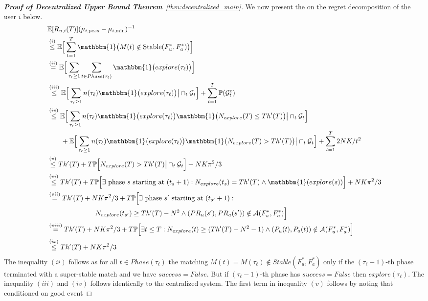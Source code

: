 \documentclass{article}
\begin{document}
\begin{proof}[\textbf{Proof of Decentralized Upper Bound Theorem}~\ref{thm:decentralized_main}]
We now present the on the regret decomposition of the user $i$ below.
\begin{align*}
   &\mathbb{E}[R_{u,i}(T)] (\mu_{i,pess} - \mu_{i, \min})^{-1} \\
   &\overset{(i)}{\leq} \mathbb{E}\Big[\sum_{t=1}^{T}  \mathbbm{1}\big( M(t) \notin \mathrm{Stable}(F^*_u, F^*_a)\big)\Big] \\
   &\overset{(ii)}{=} \mathbb{E}\Big[\sum_{\tau_{\ell}\geq 1} \sum_{t \in Phase(\tau_{\ell})}  \mathbbm{1}\big(explore(\tau_{\ell})\big) \Big] \\
   &\overset{(iii)}{\leq} \mathbb{E}\Big[\sum_{\tau_{\ell}\geq 1} n(\tau_{\ell})  \mathbbm{1}\big(explore(\tau_{\ell})\big) \big\vert \cap_t\mathcal{G}_t \Big] + \sum_{t=1}^{T}\mathbb{P}(\mathcal{G}^c_t)\\
   &\overset{(iv)}{\leq} \mathbb{E}\Big[\sum_{\tau_{\ell}\geq 1} n(\tau_{\ell}) \mathbbm{1}\big(explore(\tau_{\ell})\big) \mathbbm{1} \big(N_{explore}(T) \leq Th'(T)\big)\big\vert \cap_t\mathcal{G}_t  \Big] \\
   & \quad\quad + \mathbb{E}\Big[\sum_{\tau_{\ell}\geq 1}  n(\tau_{\ell}) \mathbbm{1}\big(explore(\tau_{\ell})\big) \mathbbm{1} \big(N_{explore}(T) > Th'(T)\big) \big\vert \cap_t\mathcal{G}_t  \Big] 
   + \sum_{t=1}^{T} 2 NK / t^2\\
   &\overset{(v)}{\leq} Th'(T) + T\mathbb{P}\Big[ N_{explore}(T) > Th'(T) \big\vert \cap_t\mathcal{G}_t \Big]  + N K \pi^2 /3\\
   &\overset{(vi)}{\leq} Th'(T) + T\mathbb{P}\Big[ \exists \text{ phase } s \text{ starting at } (t_s + 1):  N_{explore}(t_s) = Th'(T) \wedge  \mathbbm{1}(explore(s)) \Big] + N K \pi^2 /3 \\
   &\overset{(vii)}{=} Th'(T) + N K \pi^2 /3 + T \mathbb{P}\Big[ \exists \text{ phase } s' \text{ starting at } (t_{s'} + 1): \\ 
   & \hspace{7em} N_{explore}(t_{s'}) \geq  Th'(T) - N^2 \wedge (PR_{u}(s'), PR_{a}(s')) \notin \mathcal{A}(F^*_u, F^*_a) \Big] \\
   &\overset{(viii)}{=} Th'(T) + N K \pi^2 /3 + T \mathbb{P}\Big[ \exists t \leq T: N_{explore}(t) \geq  (Th'(T) - N^2 - 1) \wedge (P_{u}(t), P_{a}(t)) \notin \mathcal{A}(F^*_u, F^*_a) \Big] \\
   &\overset{(ix)}{\leq} Th'(T) + N K \pi^2 /3
\end{align*}
The inequality $(ii)$ follows as for all $t \in Phase(\tau_{\ell})$ the matching $M(t) = M(\tau_{\ell}) \notin Stable(F^*_u, F^*_a)$ only if the $(\tau_{\ell} - 1)$-th phase terminated with a super-stable match and we have $success = False$. But if $(\tau_{\ell} - 1)$-th phase has $success = False$ then $explore(\tau_{\ell})$.  The inequality $(iii)$ and $(iv)$ follows identically to the centralized system. The first term in inequality $(v)$ follows by noting that conditioned on good event

\end{proof}
\end{document}
